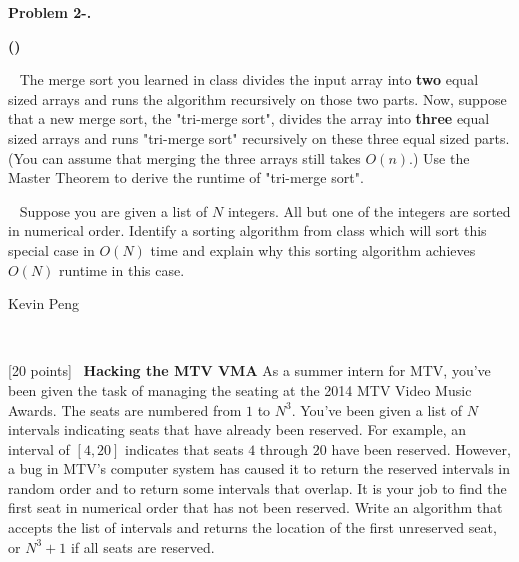 \documentclass[12pt,twoside]{article}
\makeatletter
\newcommand{\points}[1]{[#1 points]\ }
\newcounter{problemnum}
\newcommand{\theproblem}{Problem \theproblemsetnum-\arabic{problemnum}}
\newenvironment{problems}{
        \begin{list}{{\bf \theproblem. \hspace*{0.5em}}}
        {\setlength{\leftmargin}{0em}
         \setlength{\rightmargin}{0em}
         \setlength{\labelwidth}{0em}
         \setlength{\labelsep}{0em}
         \usecounter{problemnum}}}{\end{list}}
\newcommand{\problem}[1][{}]{\item \let\@currentlabel=\theproblem \textbf{#1}}
\newcounter{problempartnum}[problemnum]
\newenvironment{problemparts}{
        \begin{list}{{\bf (\alph{problempartnum})}}
        {\setlength{\leftmargin}{2.5em}
         \setlength{\rightmargin}{2.5em}
         \setlength{\labelsep}{0.5em}}}{\end{list}}
\newcommand{\problempart}{\addtocounter{problempartnum}{1}\item}
\newcommand{\theproblemsetnum}{2}
\newcommand{\yourname}{Kevin Peng}
\makeatother
\begin{document}
\begin{problems}
\begin{problemparts}
\problempart \points{5}
The merge sort you learned in class divides the input array into \textbf{two} equal sized arrays and runs the algorithm recursively on those two parts. Now, suppose that a new merge sort, the "tri-merge sort", divides the array into \textbf{three} equal sized arrays and runs "tri-merge sort" recursively on these three equal sized parts. (You can assume that merging the three arrays still takes $O(n)$.) Use the Master Theorem to derive the runtime of "tri-merge sort".


\problempart \points{5}
Suppose you are given a list of $N$ integers. All but one of the integers are sorted in numerical order. Identify a sorting algorithm from class which will sort this special case in $O(N)$ time and  explain why this sorting algorithm achieves $O(N)$ runtime in this case.


\end{problemparts}

\newpage
\begin{large} \yourname \end{large} \\


\problem \points{20} \textbf{Hacking the MTV VMA}
As a summer intern for MTV, you've been given the task of managing the seating at the 2014 MTV Video Music Awards. The seats are numbered from $1$ to $N^3$. You've been given a list of $N$ intervals indicating seats that have already been reserved. For example, an interval of $[4, 20]$ indicates that seats $4$ through $20$ have been reserved. However, a bug in MTV's computer system has caused it to return the reserved intervals in random order and to return some intervals that overlap. It is your job to find the first seat in numerical order that has not been reserved. Write an algorithm that accepts the list of intervals and returns the location of the first unreserved seat, or $N^3+1$ if all seats are reserved.


\end{problems}
\end{document}
